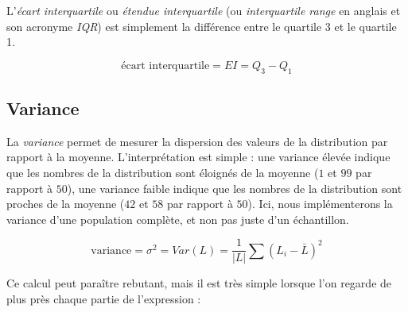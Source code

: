 \noindent L'\textit{écart interquartile} ou \textit{étendue interquartile} (ou \textit{interquartile range} en anglais et son acronyme \textit{IQR}) est simplement la différence entre le quartile 3 et le quartile 1.

\begin{center} %
\begin{equation*}
\text{écart interquartile} = EI = Q_{3} - Q_{1}
\end{equation*}
\end{center}



\bigskip


\subsection{Variance}

\noindent La \textit{variance} permet de mesurer la dispersion des valeurs de la distribution par rapport à la moyenne.
L'interprétation est simple : une variance élevée indique que les nombres de la distribution sont éloignés de la moyenne ($ 1 $ et $ 99 $ par rapport à $ 50 $), une variance faible indique que les nombres de la distribution sont proches de la moyenne ($ 42 $ et $ 58 $ par rapport à $ 50 $).
Ici, nous implémenterons la variance d'une population complète, et non pas juste d'un échantillon.


\begin{center}
\begin{equation*}
\text{variance} = \sigma^{2} = Var(L) = \frac{1}{|L|} \sum (L_{i} - \bar{L})^{2}
\end{equation*}
\end{center}

\bigskip

\noindent Ce calcul peut paraître rebutant, mais il est très simple lorsque l'on regarde de plus près chaque partie de l'expression :

\medskip

